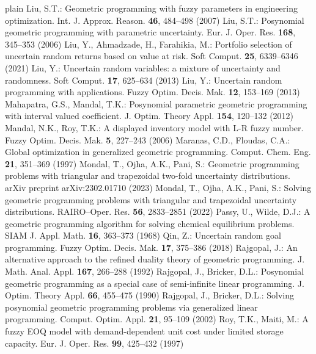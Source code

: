 \begin{thebibliography}{plain}
 Liu, S.T.: Geometric programming with fuzzy parameters in engineering optimization. Int. J. Approx. Reason. {\bf 46}, 484--498 (2007)
 Liu, S.T.: Posynomial geometric programming with parametric uncertainty. Eur. J. Oper. Res. {\bf 168}, 345--353 (2006)
 Liu, Y., Ahmadzade, H., Farahikia, M.: Portfolio selection of uncertain random returns based on value at risk. Soft Comput. {\bf 25}, 6339--6346 (2021)
 Liu, Y.: Uncertain random variables: a mixture of uncertainty and randomness. Soft Comput. {\bf 17}, 625--634 (2013)
 Liu, Y.: Uncertain random programming with applications. Fuzzy Optim. Decis. Mak. {\bf 12}, 153--169 (2013)
 Mahapatra, G.S., Mandal, T.K.: Posynomial parametric geometric programming with interval valued coefficient. J. Optim. Theory Appl. {\bf 154}, 120--132 (2012)
 Mandal, N.K., Roy, T.K.: A displayed inventory model with L-R fuzzy number. Fuzzy Optim. Decis. Mak. {\bf 5}, 227--243 (2006)
 Maranas, C.D., Floudas, C.A.: Global optimization in generalized geometric programming. Comput. Chem. Eng. {\bf 21}, 351--369 (1997)
 Mondal, T., Ojha, A.K., Pani, S.: Geometric programming problems with triangular and trapezoidal two-fold uncertainty distributions. arXiv preprint arXiv:2302.01710 (2023)
 Mondal, T., Ojha, A.K., Pani, S.: Solving geometric programming problems with triangular and trapezoidal uncertainty distributions. RAIRO--Oper. Res. {\bf 56}, 2833--2851 (2022)
 Passy, U., Wilde, D.J.: A geometric programming algorithm for solving chemical equilibrium problems. SIAM J. Appl. Math. {\bf 16}, 363--373 (1968)
 Qin, Z.: Uncertain random goal programming. Fuzzy Optim. Decis. Mak. {\bf 17}, 375--386 (2018)
 Rajgopal, J.: An alternative approach to the refined duality theory of geometric programming. J. Math. Anal. Appl. {\bf 167}, 266--288 (1992)
 Rajgopal, J., Bricker, D.L.: Posynomial geometric programming as a special case of semi-infinite linear programming. J. Optim. Theory Appl. {\bf 66}, 455--475 (1990)
 Rajgopal, J., Bricker, D.L.: Solving posynomial geometric programming problems via generalized linear programming. Comput. Optim. Appl. {\bf 21}, 95--109 (2002)
 Roy, T.K., Maiti, M.: A fuzzy EOQ model with demand-dependent unit cost under limited storage capacity. Eur. J. Oper. Res. {\bf 99}, 425--432 (1997)

\end{thebibliography}
